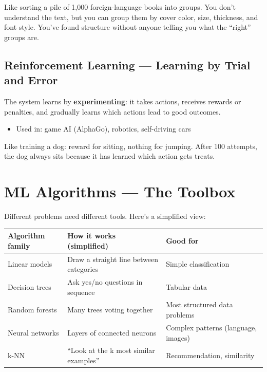 \documentclass[11pt,a4paper]{report}
\begin{document}
\begin{analogybox}
Like sorting a pile of 1,000 foreign-language books into groups. You don't understand the text, but you can group them by cover color, size, thickness, and font style. You've found structure without anyone telling you what the ``right'' groups are.
\end{analogybox}

\subsection{Reinforcement Learning --- Learning by Trial and Error}

The system learns by \textbf{experimenting}: it takes actions, receives rewards or penalties, and gradually learns which actions lead to good outcomes.

\begin{itemize}
    \item Used in: game AI (AlphaGo), robotics, self-driving cars
\end{itemize}

\begin{analogybox}
Like training a dog: reward for sitting, nothing for jumping. After 100 attempts, the dog always sits because it has learned which action gets treats.
\end{analogybox}

\section{ML Algorithms --- The Toolbox}

Different problems need different tools. Here's a simplified view:

\begin{table}[h]
\centering
\begin{tabularx}{\textwidth}{l X X}
\toprule
\textbf{Algorithm family} & \textbf{How it works (simplified)} & \textbf{Good for} \\
\midrule
Linear models & Draw a straight line between categories & Simple classification \\
Decision trees & Ask yes/no questions in sequence & Tabular data \\
Random forests & Many trees voting together & Most structured data problems \\
Neural networks & Layers of connected neurons & Complex patterns (language, images) \\
k-NN & ``Look at the k most similar examples'' & Recommendation, similarity \\
\bottomrule
\end{tabularx}
\end{table}
\end{document}
